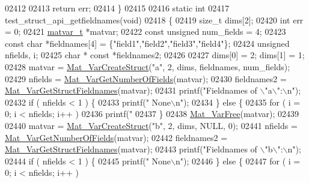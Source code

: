 \begin{DoxyCode}
{{{{{02412 
02413     \textcolor{keywordflow}{return} err;
02414 \}
02415 
02416 \textcolor{keyword}{static} \textcolor{keywordtype}{int}
02417 test\_struct\_api\_getfieldnames(\textcolor{keywordtype}{void})
02418 \{
02419     \textcolor{keywordtype}{size\_t} dims[2];
02420     \textcolor{keywordtype}{int}    err = 0;
02421     \hyperlink{group___m_a_t_structmatvar__t}{matvar\_t} *matvar;
02422     \textcolor{keyword}{const} \textcolor{keywordtype}{unsigned} num\_fields = 4;
02423     \textcolor{keyword}{const} \textcolor{keywordtype}{char} *fieldnames[4] = \{\textcolor{stringliteral}{"field1"},\textcolor{stringliteral}{"field2"},\textcolor{stringliteral}{"field3"},\textcolor{stringliteral}{"field4"}\};
02424     \textcolor{keywordtype}{unsigned} nfields, i;
02425     \textcolor{keywordtype}{char} * \textcolor{keyword}{const} *fieldnames2;
02426 
02427     dims[0] = 2; dims[1] = 1;
02428     matvar      = \hyperlink{group___m_a_t_gacecdb682a50977e54ecbdc54ed5c31bf}{Mat\_VarCreateStruct}(\textcolor{stringliteral}{"a"}, 2, dims, fieldnames, num\_fields);
02429     nfields     = \hyperlink{group___m_a_t_ga06ba20aa758543d53dc83a1ccbdc2efc}{Mat\_VarGetNumberOfFields}(matvar);
02430     fieldnames2 = \hyperlink{group___m_a_t_ga88bc328e59ce1dd8f43e917c07140803}{Mat\_VarGetStructFieldnames}(matvar);
02431     printf(\textcolor{stringliteral}{"Fieldnames of \(\backslash\)"a\(\backslash\)":\(\backslash\)n"});
02432     \textcolor{keywordflow}{if} ( nfields < 1 ) \{
02433         printf(\textcolor{stringliteral}{"  None\(\backslash\)n"});
02434     \} \textcolor{keywordflow}{else} \{
02435         \textcolor{keywordflow}{for} ( i = 0; i < nfields; i++ )
02436             printf(\textcolor{stringliteral}{"  %
02437     \}
02438     \hyperlink{group___m_a_t_ga1d14716f7450530fd1c9d02413787f0e}{Mat\_VarFree}(matvar);
02439 
02440     matvar      = \hyperlink{group___m_a_t_gacecdb682a50977e54ecbdc54ed5c31bf}{Mat\_VarCreateStruct}(\textcolor{stringliteral}{"b"}, 2, dims, NULL, 0);
02441     nfields     = \hyperlink{group___m_a_t_ga06ba20aa758543d53dc83a1ccbdc2efc}{Mat\_VarGetNumberOfFields}(matvar);
02442     fieldnames2 = \hyperlink{group___m_a_t_ga88bc328e59ce1dd8f43e917c07140803}{Mat\_VarGetStructFieldnames}(matvar);
02443     printf(\textcolor{stringliteral}{"Fieldnames of \(\backslash\)"b\(\backslash\)":\(\backslash\)n"});
02444     \textcolor{keywordflow}{if} ( nfields < 1 ) \{
02445         printf(\textcolor{stringliteral}{"  None\(\backslash\)n"});
02446     \} \textcolor{keywordflow}{else} \{
02447         \textcolor{keywordflow}{for} ( i = 0; i < nfields; i++ )
}}}}}}
\end{DoxyCode}
